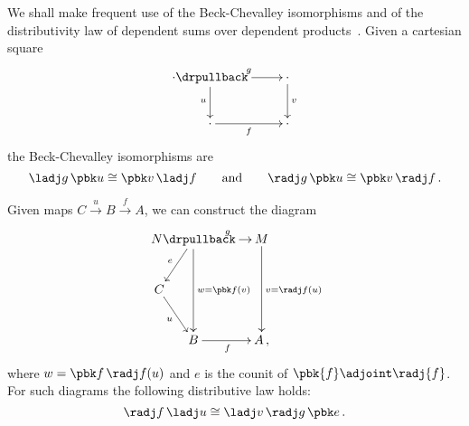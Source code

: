 \begin{para}\label{para:BC-distr}
  We shall make frequent use of the Beck-Chevalley isomorphisms and
  of the distributivity law of dependent sums over dependent
  products~\cite{MoerdijkI:weltc}.  Given a cartesian square
  \[
  \xymatrix {
  \cdot \drpullback \ar[r]^g \ar[d]_u & \cdot \ar[d]^v \\
  \cdot \ar[r]_f & \cdot
  }
  \]
  the Beck-Chevalley isomorphisms are
  \[
    \ladj g \, \pbk u \iso \pbk v \, \ladj f \qquad \text{and} \qquad
    \radj g \, \pbk u \iso \pbk v \, \radj f \,.
    \]

  Given maps $C \stackrel u \longrightarrow B \stackrel f \longrightarrow A$,
  we can construct the diagram
  \begin{equation}\label{distr-diag}
  \xymatrixrowsep{40pt}
  \xymatrixcolsep{27pt}
  \vcenter{\hbox{
  \xymatrix @!=0pt {
  &N \drpullback \ar[rr]^g \ar[ld]_e \ar[dd]^{w=\pbk f(v)}&& M \ar[dd]^{v=\radj f (u)} \\
  C \ar[rd]_u && & \\
  &B \ar[rr]_f && A\,,
  }}}
  \end{equation}
  where $w = \pbk f\, \radj f(u)$ and $e$ is the counit
  of $\pbk{f} \adjoint \radj{f}$.
  For such diagrams the following
  distributive law holds:
  \begin{equation}\label{distr-law}
  \radj f \, \ladj u \iso \ladj v \, \radj g \, \pbk e \,.
  \end{equation}


\end{para}
